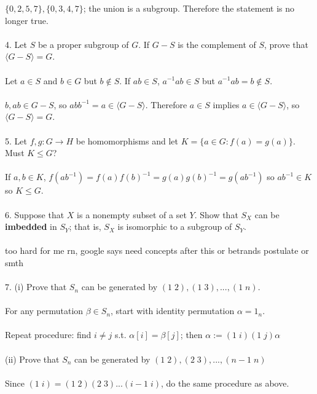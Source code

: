 \documentclass{article}
\begin{document}
\begin{siderules}
\null\qquad \(\{0,2,5,7\},\{0,3,4,7\}\); the union is a subgroup. Therefore the statement is no longer true.\\\\
\color{blue}4. Let \(S\) be a proper subgroup of \(G\). If \(G-S\) is the complement of \(S\), 
prove that \(\langle G-S\rangle=G\).\\\\\color{black}
\null\qquad Let \(a\in S\) and \(b\in G\) but \(b\notin S\). If \(ab\in S\), \(a^{-1}ab\in S\) but \(a^{-1}ab=b\notin S\).\\\\
\null\qquad \(b,ab\in G-S\), so \(abb^{-1}=a\in\langle G-S\rangle\). Therefore \(a\in S\) implies \(a\in\langle G-S\rangle\), so \(\langle G-S\rangle=G\).\\\\
\color{blue}5. Let \(f,g:G\to H\) be homomorphisms and let \(K=\{a\in G:f(a)=g(a)\}\). Must \(K\le G\)?\color{black}\\\\
\null\qquad If \(a,b\in K\), \(f(ab^{-1})=f(a)f(b)^{-1}=g(a)g(b)^{-1}=g(ab^{-1})\) so \(ab^{-1}\in K\) so \(K\le G\).\\\\
\color{blue}6. Suppose that \(X\) is a nonempty subset of a set \(Y\). Show that \(S_{X}\) 
can be \textbf{imbedded} in \(S_{Y}\); that is, \(S_{X}\) is isomorphic to a subgroup of \(S_{Y}\).\\\\\color{black}
\null\qquad too hard for me rn, google says need concepts after this or betrands postulate or smth\\\\
\color{blue}7. (i) Prove that \(S_{n}\) can be generated by \((1\;2), (1\;3), ..., (1\;n)\).\color{black}\\\\
\null\qquad For any permutation \(\beta\in S_{n}\), start with identity permutation \(\alpha=1_{n}\).\\\\
\null\qquad Repeat procedure: find \(i\neq j\) s.t. \(\alpha[i]=\beta[j]\); then \(\alpha:=(1\;i)(1\;j)\alpha\)\\\\
\color{blue}(ii) Prove that \(S_{n}\) can be generated by \((1\;2), (2\;3), ..., (n-1\;n)\)\color{black}\\\\
\null\qquad Since \((1\;i)=(1\;2)(2\;3)...(i-1\;i)\), do the same procedure as above.\\\\

\end{siderules}
\end{document}
